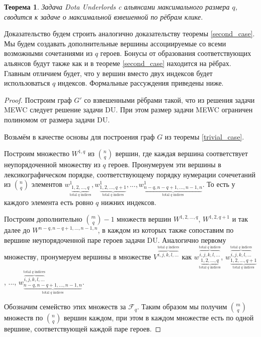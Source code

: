 \documentclass{article}
\newtheorem{theorem}{Теорема}
\begin{document}
\begin{theorem}
\label{general_case}
    Задача Dota Underlords c альянсами максимального размера  $q$, сводится к задаче о максимальной взвешенной по рёбрам клике.
\end{theorem}
	Доказательство будем строить аналогично доказательству теоремы \ref{second_case}. 
Мы будем создавать дополнительные вершины ассоциируемые со всеми возможными сочетаниями из $q$ героев. Бонусы от образования соответствующих альянсов будут также как и в теореме \ref{second_case} находится на рёбрах.
Главным отличием будет, что у вершин вместо двух индексов будет использоваться $q$ индексов. Формальные рассуждения приведены ниже.
\begin{proof}
    Построим граф $G'$ со взвешенными рёбрами такой, что из решения задачи MEWC следует решение задачи DU. При этом размер задачи MEWC ограничен полиномом от размера задачи DU.
    
    Возьмём в качестве основы для построения граф $G$ из теоремы \ref{trivial_case}.
    
    Построим множество $ W^{1, q }$ из $\binom{n}{q}$ вершин, где каждая вершина соответствует неупорядоченной множеству из $q$ героев. Пронумеруем эти вершины в лексикографическом порядке, соответствующему порядку нумерации сочечетаний из $\binom{n}{q}$ элементов $w^1_{ \underbrace{1,2,...,q}_\text{total $q$ indices}}, w^1_{\underbrace{1,2,...,q+1}_\text{total $q$ indices}},..., w^1_{ \underbrace{ n-q, n-q+1,..., n-1,n}_\text{total $q$ indices}} $. То есть у каждого элемента есть ровно $q$ нижних индексов.

    Построим дополнительно $\binom{m}{q}-1$ множеств вершин $W^{1,2,...,q}$, $W^{1,2,q+1}$ и так далее до $W^{n-q, n-q+1,..., n-1,n}$, в каждом из которых также сопоставим по вершине неупорядоченной паре героев задачи DU. Аналогично первому множеству, пронумеруем вершины в множестве $V^{\overbrace{i,j,k,l,...}^\text{total $q$ indices}}$ как $w_{\underbrace{1,2,...,q}_\text{total $q$ indices}}^{\overbrace{i,j,k,l,...}^\text{total $q$ indices}}$, $w_{\underbrace{1,2,...,q+1}_\text{total $q$ indices}}^{\overbrace{i,j,k,l,...}^\text{total $q$ indices}}$, ..., $w_{ \underbrace{ n-q, n-q+1,..., n-1,n}_\text{total $q$ indices}}^{\overbrace{i,j,k,l,...}^\text{total $q$ indices}}$.
    
    Обозначим семейство этих множеств за $\mathcal{F}_q$. Таким образом мы получим $\binom{m}{q}$ множеств по $\binom{n}{q}$ вершин каждом, при этом в каждом множестве есть по одной вершине, соответствующей каждой паре героев.
    

\end{proof}
\end{document}
